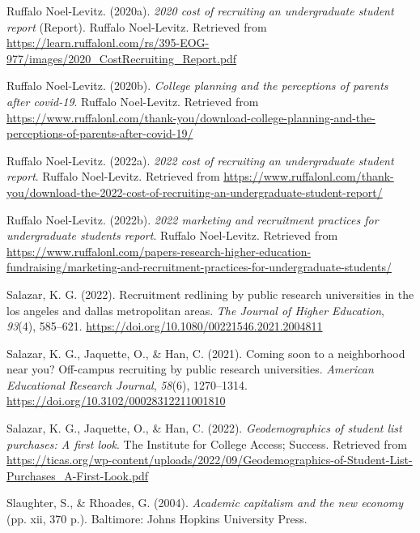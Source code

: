 \documentclass[
  12pt,
]{article}
\newlength{\cslhangindent}
\newlength{\cslentryspacingunit} %
\newenvironment{CSLReferences}[2] %
 {%
  \setlength{\parindent}{0pt}
  \ifodd #1
  \let\oldpar\par
  \def\par{\hangindent=\cslhangindent\oldpar}
  \fi
  \setlength{\parskip}{#2\cslentryspacingunit}
 }%
 {}
\begin{document}
\begin{CSLReferences}{1}{0}
\leavevmode{}%
Ruffalo Noel-Levitz. (2020a). \emph{2020 cost of recruiting an undergraduate student report} (Report). Ruffalo Noel-Levitz. Retrieved from \url{https://learn.ruffalonl.com/rs/395-EOG-977/images/2020_CostRecruiting_Report.pdf}

\leavevmode{}%
Ruffalo Noel-Levitz. (2020b). \emph{College planning and the perceptions of parents after covid-19}. Ruffalo Noel-Levitz. Retrieved from \url{https://www.ruffalonl.com/thank-you/download-college-planning-and-the-perceptions-of-parents-after-covid-19/}

\leavevmode{}%
Ruffalo Noel-Levitz. (2022a). \emph{2022 cost of recruiting an undergraduate student report}. Ruffalo Noel-Levitz. Retrieved from \url{https://www.ruffalonl.com/thank-you/download-the-2022-cost-of-recruiting-an-undergraduate-student-report/}

\leavevmode{}%
Ruffalo Noel-Levitz. (2022b). \emph{2022 marketing and recruitment practices for undergraduate students report}. Ruffalo Noel-Levitz. Retrieved from \url{https://www.ruffalonl.com/papers-research-higher-education-fundraising/marketing-and-recruitment-practices-for-undergraduate-students/}

\leavevmode{}%
Salazar, K. G. (2022). Recruitment redlining by public research universities in the los angeles and dallas metropolitan areas. \emph{The Journal of Higher Education}, \emph{93}(4), 585--621. \url{https://doi.org/10.1080/00221546.2021.2004811}

\leavevmode{}%
Salazar, K. G., Jaquette, O., \& Han, C. (2021). Coming soon to a neighborhood near you? Off-campus recruiting by public research universities. \emph{American Educational Research Journal}, \emph{58}(6), 1270--1314. \url{https://doi.org/10.3102/00028312211001810}

\leavevmode{}%
Salazar, K. G., Jaquette, O., \& Han, C. (2022). \emph{Geodemographics of student list purchases: A first look}. The Institute for College Access; Success. Retrieved from \url{https://ticas.org/wp-content/uploads/2022/09/Geodemographics-of-Student-List-Purchases_A-First-Look.pdf}

\leavevmode{}%
Slaughter, S., \& Rhoades, G. (2004). \emph{Academic capitalism and the new economy} (pp. xii, 370 p.). Baltimore: Johns Hopkins University Press.


\end{CSLReferences}
\end{document}
